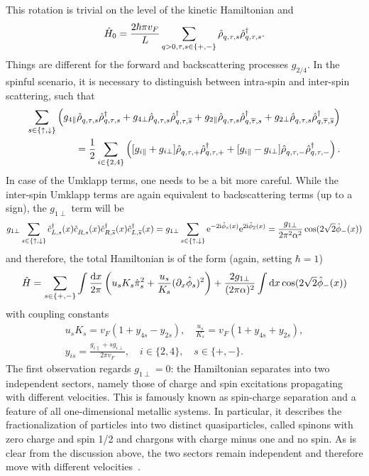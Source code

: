 This rotation is trivial on the level of the kinetic Hamiltonian and
\begin{align}
    \hat H_0 = \frac{2\hbar\pi v_F}L\sum_{q>0,\tau,s\in\{+,-\}}\hat\rho^\pdag_{q,\tau,s}\hat\rho^\dag_{q,\tau,s}.
\end{align}
Things are different for the forward and backscattering processes $g_{2/4}$.
In the spinful scenario, it is necessary to distinguish between intra-spin and inter-spin scattering, such that
\begin{align}
  \sum_{s\in\{\uparrow,\downarrow\}}
  \brlr{
  g_{4\parallel}\hat\rho^\pdag_{q,\tau,s}\hat\rho^\dag_{q,\tau,s}
  +
  g_{4\perp}\hat\rho^\pdag_{q,\tau,s}\hat\rho^\dag_{q,\tau,\overline s}
  +
  g_{2\parallel}\hat\rho^\pdag_{q,\tau,s}\hat\rho^\dag_{q,\overline\tau,s}
  +
  g_{2\perp}\hat\rho^\pdag_{q,\tau,s}\hat\rho^\dag_{q,\overline\tau,\overline s}
  }
  \\
  =
  \frac12
  \sum_{i\in\{2,4\}}
  \brlr{
  [g_{i\parallel}+g_{i\perp}]\hat\rho^\pdag_{q,\tau,+}\hat\rho^\dag_{q,\tau,+}
  +
  [g_{i\parallel}-g_{i\perp}]\hat\rho^\pdag_{q,\tau,-}\hat\rho^\dag_{q,\tau,-}
  }.
\end{align}
In case of the Umklapp terms, one needs to be a bit more careful.
While the inter-spin Umklapp terms are again equivalent to backscattering terms (up to a sign), the $g_{1\perp}$ term will be
\begin{align}
    g_{1\perp}\sum_{s\in\{\uparrow,\downarrow\}}\hat c^\dag_{L,s}(x)\hat c^\pdag_{R,s}(x)\hat c^\dag_{R,\overline s}(x)\hat c^\dag_{L,\overline s}(x)
    =
    g_{1\perp}\sum_{s\in\{\uparrow,\downarrow\}}\re^{-2\ri\hat \phi_s(x)}\re^{2\ri\hat \phi_{\overline s}(x)}
    =
    \frac{g_{1\perp}}{2\pi^2\alpha^2}\cos(2\sqrt2\hat \phi_-(x))
\end{align}
and therefore, the total Hamiltonian is of the form (again, setting $\hbar=1$)
\begin{align}
    \hat H = \sum_{s\in\{+,-\}}\int\frac{\mathrm d x}{2\pi}\left( u_s K_s\hat\pi_s^2 + \frac{u_s}{K_s}(\partial_x\hat\phi_s)^2 \right)
    +
    \frac{2g_{1\perp}}{(2\pi\alpha)^2}\int\mathrm d x\cos(2\sqrt2\hat\phi_-(x))
    \label{eq:ll_hamiltonian_spin}
\end{align}
with coupling constants
\begin{align}
    u_sK_s = v_F(1+y_{4s}-y_{2s}),
    \quad
    \frac{u_s}{K_s} = v_F(1+y_{4s}+y_{2s}),
    \\
    y_{is} = \frac{g_{i\parallel}+sg_{i\perp}}{2\pi v_F},
    \quad
    i\in\{2,4\},
    \quad
    s\in\{+,-\}.
\end{align}
The first observation regards $g_{1\perp}=0$: the Hamiltonian separates into two independent sectors, namely those of charge and spin excitations propagating with different velocities.
This is famously known as spin-charge separation and a feature of all one-dimensional metallic systems.
In particular, it describes the fractionalization of particles into two distinct quasiparticles, called spinons with zero charge and spin 1/2 and chargons with charge minus one and no spin.
As is clear from the discussion above, the two sectors remain independent and therefore move with different velocities~\cite{Tomonaga1950,Luttinger1963,Haldane1981,Kim2006}.

